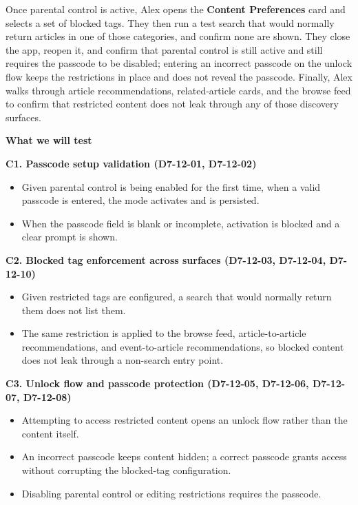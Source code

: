 \documentclass[a4paper, 12pt]{article}
\begin{document}
    Once parental control is active, Alex opens the \textbf{Content Preferences}
    card and selects a set of blocked tags. They then run a test search that would
    normally return articles in one of those categories, and confirm none are
    shown. They close the app, reopen it, and confirm that parental control is still
    active and still requires the passcode to be disabled; entering an incorrect
    passcode on the unlock flow keeps the restrictions in place and does not
    reveal the passcode. Finally, Alex walks through article recommendations, related-article
    cards, and the browse feed to confirm that restricted content does not leak
    through any of those discovery surfaces.

    \textbf{What we will test}

    \textbf{C1. Passcode setup validation (D7-12-01, D7-12-02)}

    \begin{itemize}
        \item Given parental control is being enabled for the first time, when a
            valid passcode is entered, the mode activates and is persisted.

        \item When the passcode field is blank or incomplete, activation is
            blocked and a clear prompt is shown.
    \end{itemize}

    \textbf{C2. Blocked tag enforcement across surfaces (D7-12-03, D7-12-04, D7-12-10)}

    \begin{itemize}
        \item Given restricted tags are configured, a search that would normally
            return them does not list them.

        \item The same restriction is applied to the browse feed, article-to-article
            recommendations, and event-to-article recommendations, so blocked
            content does not leak through a non-search entry point.
    \end{itemize}

    \textbf{C3. Unlock flow and passcode protection (D7-12-05, D7-12-06, D7-12-07,
    D7-12-08)}

    \begin{itemize}
        \item Attempting to access restricted content opens an unlock flow rather
            than the content itself.

        \item An incorrect passcode keeps content hidden; a correct passcode
            grants access without corrupting the blocked-tag configuration.

        \item Disabling parental control or editing restrictions requires the passcode.
    \end{itemize}
\end{document}

